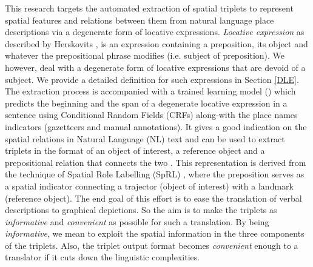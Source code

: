 \documentclass{acm_proc_article-sp}
\begin{document}
This research targets the automated extraction of spatial triplets to represent spatial features and relations between them from natural language place descriptions via a degenerate form of locative expressions. \textit{Locative expression} as described by Herskovits \cite{herskovits:pragmatics}, is an expression containing a preposition, its object and whatever the prepositional phrase modifies (i.e. subject of preposition). We however, deal with a degenerate form of locative expressions that are devoid of a subject. We provide a detailed definition for such expressions in Section \ref{DLE}.
The extraction process is accompanied with a trained learning model (\cite{fei:locative}) which predicts the beginning and the span of a degenerate locative expression in a sentence using Conditional Random Fields (CRFs) along-with the place names indicators (gazetteers and manual annotations). It gives a good indication on the spatial relations in Natural Language (NL) text and can be used to extract triplets in the format of an object of interest, a reference object and a prepositional relation that connects the two . This representation is derived from the technique of Spatial Role Labelling (SpRL) \cite{Kordjamshidi:labelling}, where the preposition serves as a spatial indicator connecting a trajector (object of interest) with a landmark (reference object). The end goal of this effort is to ease the translation of verbal descriptions to graphical depictions. So the aim is to make the triplets as \textit{informative} and \textit{convenient} as possible for such a translation. By being \textit{informative}, we mean to exploit the spatial information in the three components of the triplets. Also, the triplet output format becomes \textit{convenient} enough to a translator if it cuts down the linguistic complexities. 
\end{document}

